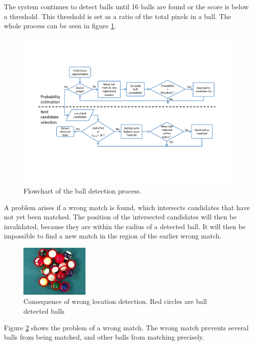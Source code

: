 The system continues to detect balls until 16 balls are found or the score is below a threshold. This threshold is set as a ratio of the total pixels in a ball. The whole process can be seen in figure \ref{fig:ballflowchart}.

\begin{figure}[htpb]
\begin{center}
\includegraphics[width=\textwidth]{images/ballflowchart.pdf}
\caption{Flowchart of the ball detection process.}
\label{fig:ballflowchart}
\end{center}
\end{figure}

A problem arises if a wrong match is found, which intersects candidates that have not yet been matched. The position of the intersected candidates will then be invalidated, because they are within the radius of a detected ball. It will then be impossible to find a new match in the region of the earlier wrong match. 
\begin{figure}[htpb]
\begin{center}
\includegraphics[width=0.3\textwidth]{images/wronglocate.jpg}
\caption{Consequence of wrong location detection. Red circles are ball detected balls}
\label{fig:wronglocate}
\end{center}
\end{figure}
Figure \ref{fig:wronglocate} shows the problem of a wrong match. The wrong match prevents several balls from being matched, and other balls from matching precisely.

